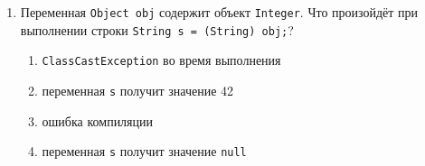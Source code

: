 \begin{enumerate}
\item Переменная \texttt{Object obj} содержит объект \texttt{Integer}. Что
      произойдёт при выполнении строки \texttt{String s = (String) obj;}?
  \begin{enumerate}
    \item[а)] \texttt{ClassCastException} во время выполнения
    \item[б)] переменная \texttt{s} получит значение 42
    \item[в)] ошибка компиляции
    \item[г)] переменная \texttt{s} получит значение \texttt{null}
  \end{enumerate}

\end{enumerate}
